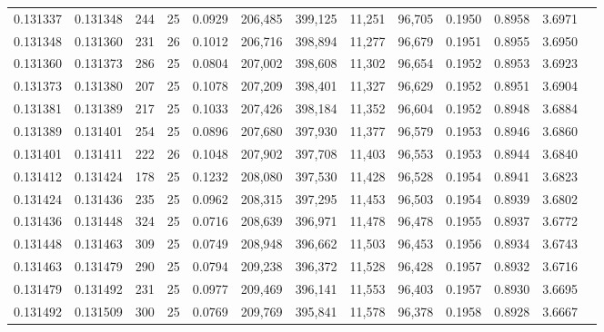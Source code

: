 \begin{tabular}{rrrrrrrrrrrrr}
0.131337 & 0.131348 &   244 &  25 &                                     0.0929 & 206,485 & 399,125 &  11,251 &  96,705 & 0.1950 & 0.8958 & 3.6971 \\
0.131348 & 0.131360 &   231 &  26 &                                     0.1012 & 206,716 & 398,894 &  11,277 &  96,679 & 0.1951 & 0.8955 & 3.6950 \\
0.131360 & 0.131373 &   286 &  25 &                                     0.0804 & 207,002 & 398,608 &  11,302 &  96,654 & 0.1952 & 0.8953 & 3.6923 \\
0.131373 & 0.131380 &   207 &  25 &                                     0.1078 & 207,209 & 398,401 &  11,327 &  96,629 & 0.1952 & 0.8951 & 3.6904 \\
0.131381 & 0.131389 &   217 &  25 &                                     0.1033 & 207,426 & 398,184 &  11,352 &  96,604 & 0.1952 & 0.8948 & 3.6884 \\
0.131389 & 0.131401 &   254 &  25 &                                     0.0896 & 207,680 & 397,930 &  11,377 &  96,579 & 0.1953 & 0.8946 & 3.6860 \\
0.131401 & 0.131411 &   222 &  26 &                                     0.1048 & 207,902 & 397,708 &  11,403 &  96,553 & 0.1953 & 0.8944 & 3.6840 \\
0.131412 & 0.131424 &   178 &  25 &                                     0.1232 & 208,080 & 397,530 &  11,428 &  96,528 & 0.1954 & 0.8941 & 3.6823 \\
0.131424 & 0.131436 &   235 &  25 &                                     0.0962 & 208,315 & 397,295 &  11,453 &  96,503 & 0.1954 & 0.8939 & 3.6802 \\
0.131436 & 0.131448 &   324 &  25 &                                     0.0716 & 208,639 & 396,971 &  11,478 &  96,478 & 0.1955 & 0.8937 & 3.6772 \\
0.131448 & 0.131463 &   309 &  25 &                                     0.0749 & 208,948 & 396,662 &  11,503 &  96,453 & 0.1956 & 0.8934 & 3.6743 \\
0.131463 & 0.131479 &   290 &  25 &                                     0.0794 & 209,238 & 396,372 &  11,528 &  96,428 & 0.1957 & 0.8932 & 3.6716 \\
0.131479 & 0.131492 &   231 &  25 &                                     0.0977 & 209,469 & 396,141 &  11,553 &  96,403 & 0.1957 & 0.8930 & 3.6695 \\
0.131492 & 0.131509 &   300 &  25 &                                     0.0769 & 209,769 & 395,841 &  11,578 &  96,378 & 0.1958 & 0.8928 & 3.6667 \\

\end{tabular}
